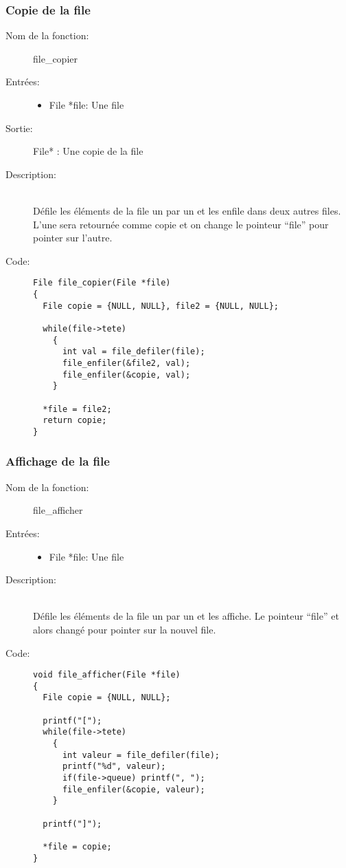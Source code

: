 \documentclass[a4paper]{article}
\begin{document}
\subsubsection{Copie de la file}
\begin{description}
  \item[Nom de la fonction:] file\_copier

  \item[Entrées:] \hfill
    \begin{itemize}
      \item File *file: Une file
    \end{itemize}

 \item[Sortie:] \hfill
   File* : Une copie de la file

  \item[Description:] \hfill \\ 
    Défile les éléments de la file un par un et les enfile dans deux autres files.
    L'une sera retournée comme copie et on change le pointeur ``file'' pour pointer 
    sur l'autre.

  \item[Code:] \hfill
  \begin{lstlisting}
File file_copier(File *file)
{
  File copie = {NULL, NULL}, file2 = {NULL, NULL};

  while(file->tete)
    {
      int val = file_defiler(file);
      file_enfiler(&file2, val);
      file_enfiler(&copie, val);
    }

  *file = file2;
  return copie;
}
  \end{lstlisting}
\end{description}

\subsubsection{Affichage de la file}
\begin{description}
  \item[Nom de la fonction:] file\_afficher

  \item[Entrées:] \hfill
    \begin{itemize}
      \item File *file: Une file
    \end{itemize}

  \item[Description:] \hfill \\ 
    Défile les éléments de la file un par un et les affiche. Le pointeur ``file''
    et alors changé pour pointer sur la nouvel file.

  \item[Code:] \hfill
  \begin{lstlisting}
void file_afficher(File *file)
{
  File copie = {NULL, NULL};

  printf("[");
  while(file->tete)
    {
      int valeur = file_defiler(file);
      printf("%d", valeur);
      if(file->queue) printf(", ");
      file_enfiler(&copie, valeur);
    }

  printf("]");

  *file = copie;
}
  \end{lstlisting}
\end{description}
\end{document}
